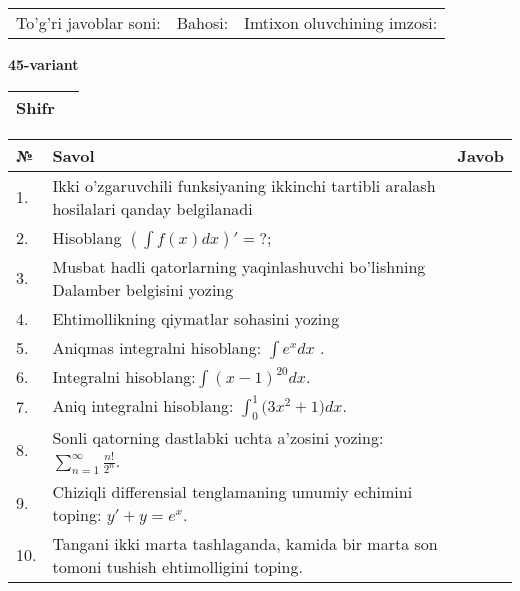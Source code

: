 \documentclass{article}
\begin{document}
  \vspace{1cm}
  
  \begin{tabular}{lll}
  To'g'ri javoblar soni: \underline{\hspace{1.5cm}} & 
  Bahosi: \underline{\hspace{1.5cm}} & 
  Imtixon oluvchining imzosi: \underline{\hspace{2cm}} \\
  \end{tabular}
  
  \egroup
  
  \newpage
  
  
  \textbf{45-variant}\\
  
  \bgroup
  \def\arraystretch{1.6} %
  
  \begin{tabular}{|m{5.7cm}|m{9.5cm}|}
  \hline
  Shifr & \\
  \hline
  \end{tabular}
  
  \vspace{1cm}
  
  \begin{tabular}{|m{0.7cm}|m{10cm}|m{4cm}|}
  \hline
  № & Savol & Javob \\
  \hline
  1. & Ikki o'zgaruvchili funksiyaning ikkinchi tartibli aralash hosilalari qanday belgilanadi &  \\
  \hline
  2. & Hisoblang \(\left( \int {f(x)dx} \right)' = ?\); &  \\
  \hline
  3. & Musbat hadli qatorlarning yaqinlashuvchi bo'lishning Dalamber belgisini yozing &  \\
  \hline
  4. & Ehtimollikning qiymatlar sohasini yozing &  \\
  \hline
  5. & Aniqmas integralni hisoblang: \(\int {e^{x}dx}\) . &  \\
  \hline
  6. & Integralni hisoblang:\(\int {(x - 1)^{20}}dx\). &  \\
  \hline
  7. & Aniq integralni hisoblang: \(\int_{0}^{1}{(3x^{2}} + 1)dx\). &  \\
  \hline
  8. & Sonli qatorning dastlabki uchta a'zosini yozing: \(\sum_{n = 1}^{\infty}\frac{n!}{2^{n}}\). &  \\
  \hline
  9. & Chiziqli differensial tenglamaning umumiy echimini toping: \(y' + y = e^{x}\). &  \\
  \hline
  10. & Tangani ikki marta tashlaganda, kamida bir marta son tomoni tushish ehtimolligini toping. &  \\
  \hline
  \end{tabular}
  
\end{document}
